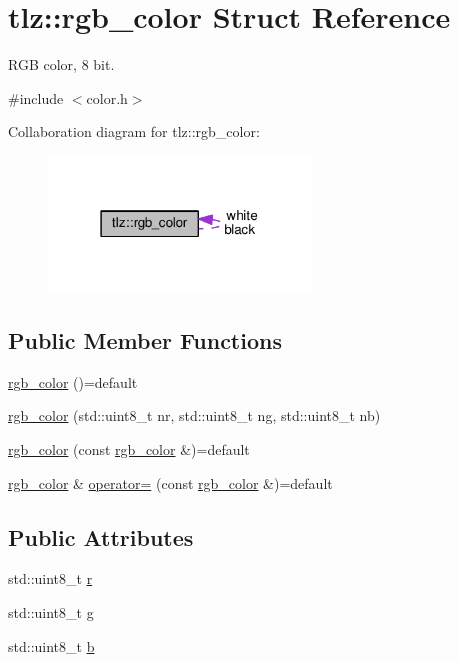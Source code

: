 \hypertarget{structtlz_1_1rgb__color}{}\section{tlz\+:\+:rgb\+\_\+color Struct Reference}
\label{structtlz_1_1rgb__color}


R\+GB color, 8 bit.  




{\ttfamily \#include $<$color.\+h$>$}



Collaboration diagram for tlz\+:\+:rgb\+\_\+color\+:
\nopagebreak
\begin{figure}[H]
\begin{center}
\leavevmode
\includegraphics[width=198pt]{structtlz_1_1rgb__color__coll__graph}
\end{center}
\end{figure}
\subsection*{Public Member Functions}
\begin{DoxyCompactItemize}
\item 
\hyperlink{structtlz_1_1rgb__color_a160ee6cf678c18984fbe61cbbca23d7d}{rgb\+\_\+color} ()=default
\item 
\hyperlink{structtlz_1_1rgb__color_aaeaedd7ccd9bcfb6e2dbbf01a7f924dd}{rgb\+\_\+color} (std\+::uint8\+\_\+t nr, std\+::uint8\+\_\+t ng, std\+::uint8\+\_\+t nb)
\item 
\hyperlink{structtlz_1_1rgb__color_a6b10e845d6f092efbca9672d29dab2f0}{rgb\+\_\+color} (const \hyperlink{structtlz_1_1rgb__color}{rgb\+\_\+color} \&)=default
\item 
\hyperlink{structtlz_1_1rgb__color}{rgb\+\_\+color} \& \hyperlink{structtlz_1_1rgb__color_a247ac65eca6801974bd71fd94b92930f}{operator=} (const \hyperlink{structtlz_1_1rgb__color}{rgb\+\_\+color} \&)=default
\end{DoxyCompactItemize}
\subsection*{Public Attributes}
\begin{DoxyCompactItemize}
\item 
std\+::uint8\+\_\+t \hyperlink{structtlz_1_1rgb__color_a837fcb70e392747f6a144b7924c01c97}{r}
\item 
std\+::uint8\+\_\+t \hyperlink{structtlz_1_1rgb__color_a2f9695262ce9c151330413fc0f0b4f2c}{g}
\item 
std\+::uint8\+\_\+t \hyperlink{structtlz_1_1rgb__color_a3ab5877ed2c04f83487b4abea6e88e71}{b}
\end{DoxyCompactItemize}
